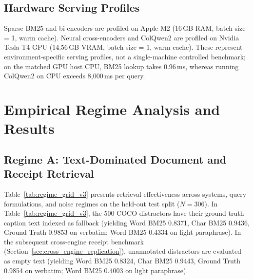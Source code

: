 \subsection{Hardware Serving Profiles}
Sparse BM25 and bi-encoders are profiled on Apple M2 (16\,GB RAM, batch size = 1, warm cache). Neural cross-encoders and ColQwen2 are profiled on Nvidia Tesla T4 GPU (14.56\,GB VRAM, batch size = 1, warm cache). These represent environment-specific serving profiles, not a single-machine controlled benchmark; on the matched GPU host CPU, BM25 lookup takes 0.96\,ms, whereas running ColQwen2 on CPU exceeds 8,000\,ms per query.

\section{Empirical Regime Analysis and Results}
\label{sec:results}

\subsection{Regime A: Text-Dominated Document and Receipt Retrieval}
\label{sec:regime_a_text}

Table~\ref{tab:regime_grid_v3} presents retrieval effectiveness across systems, query formulations, and noise regimes on the held-out test split ($N=306$). In Table~\ref{tab:regime_grid_v3}, the 500 COCO distractors have their ground-truth caption text indexed as fallback (yielding Word BM25 0.8371, Char BM25 0.9436, Ground Truth 0.9853 on verbatim; Word BM25 0.4334 on light paraphrase). In the subsequent cross-engine receipt benchmark (Section~\ref{sec:cross_engine_replication}), unannotated distractors are evaluated as empty text (yielding Word BM25 0.8324, Char BM25 0.9443, Ground Truth 0.9854 on verbatim; Word BM25 0.4003 on light paraphrase).

